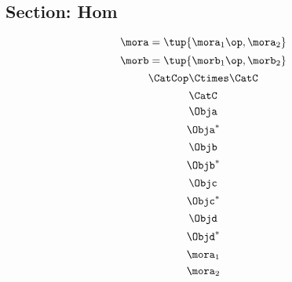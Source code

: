 {\begin{forslides}
    \subsection{Section: Hom}

    \begin{equation}
        \label{eq:hom1}
        \mora = \tup{\mora_1\op,\mora_2}
    \end{equation}
    \begin{equation}
        \label{eq:hom1b}
        \morb = \tup{\morb_1\op,\morb_2}
    \end{equation}
    \begin{equation}
        \label{eq:hom2b}
        \CatCop \Ctimes\CatC
    \end{equation}
    \begin{equation}
        \label{eq:CatC}
        \CatC
    \end{equation}
    \begin{equation}
        \label{eq:hom-X}
        \Obja
    \end{equation}
    \begin{equation}
        \label{eq:hom-X-op}
        \Obja^\ast
    \end{equation}
    \begin{equation}
        \label{eq:hom-Y}
        \Objb
    \end{equation}
    \begin{equation}
        \label{eq:hom-Y-op}
        \Objb^\ast
    \end{equation}
    \begin{equation}
        \label{eq:hom-Z}
        \Objc
    \end{equation}
    \begin{equation}
        \label{eq:hom-Z-op}
        \Objc^\ast
    \end{equation}
    \begin{equation}
        \label{eq:hom-W}
        \Objd
    \end{equation}
    \begin{equation}
        \label{eq:hom-W-op}
        \Objd^\ast
    \end{equation}
    \begin{equation}
        \label{eq:f1}
        \mora_1
    \end{equation}
    \begin{equation}
        \label{eq:f2}
        \mora_2
    \end{equation}

\end{forslides}}
